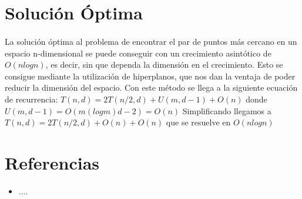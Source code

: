 \documentclass{article}
\begin{document}
\section{Solución Óptima}
	\paragraph{}
	La solución óptima al problema de encontrar el par de puntos más cercano en un espacio n-dimensional se puede conseguir con un crecimiento asintótico de $O(nlogn)$, es decir, sin que dependa la dimensión en el crecimiento. Esto se consigue mediante la utilización de hiperplanos, que nos dan la ventaja de poder reducir la dimensión del espacio. Con este método se llega a la siguiente ecuación de recurrencia:
	$T(n, d) = 2T(n/2, d) + U(m, d - 1) + O(n)$ donde $U(m, d-1)=O(m (logm) d - 2) = O(n)$
	Simplificando llegamos a $T(n,d)=2T(n/2,d)+O(n)+O(n)$ que se resuelve en $O(nlogn)$ 

\section{Referencias}

	\begin{itemize}
		\item
		....
	\end{itemize}
\end{document}
